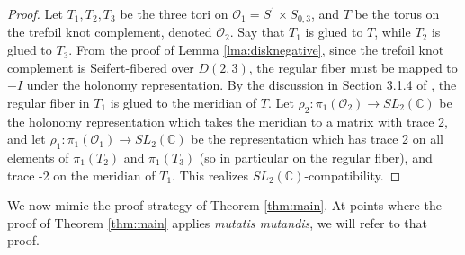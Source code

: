 \documentclass{article}
\theoremstyle{plain}
\theoremstyle{definition}
\theoremstyle{plain}
\theoremstyle{plain}
\theoremstyle{plain}
\theoremstyle{remark}
\theoremstyle{remark}
\theoremstyle{plain}
\theoremstyle{plain}
\begin{document}
\begin{proof}
Let $T_1, T_2, T_3$ be the three tori on $\mathcal{O}_1 = S^1 \times S_{0, 3}$, and $T$ be the torus on the trefoil knot complement, denoted $\mathcal{O}_2$. Say that $T_1$ is glued to $T$, while $T_2$ is glued to $T_3$. From the proof of Lemma \ref{lma:disknegative}, since the trefoil knot complement is Seifert-fibered over $D(2, 3)$, the regular fiber must be mapped to $-I$ under the holonomy representation. By the discussion in Section 3.1.4 of \cite{sekino}, the regular fiber in $T_1$ is glued to the meridian of $T$. Let $\rho_2: \pi_1(\mathcal{O}_2) \to SL_2(\mathbb{C})$ be the holonomy representation which takes the meridian to a matrix with trace 2, and let $\rho_1: \pi_1(\mathcal{O}_1) \to SL_2(\mathbb{C})$ be the representation which has trace 2 on all elements of $\pi_1(T_2)$ and $\pi_1(T_3)$ (so in particular on the regular fiber), and trace -2 on the meridian of $T_1$. This realizes $SL_2(\mathbb{C})$-compatibility. 
\end{proof}

We now mimic the proof strategy of Theorem \ref{thm:main}. At points where the proof of Theorem \ref{thm:main} applies \textit{mutatis mutandis}, we will refer to that proof.
\end{document}
